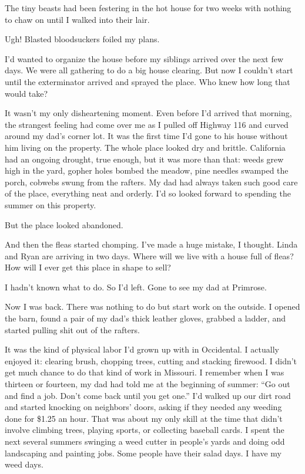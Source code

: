 \documentclass[12pt]{book}
\begin{document}
The tiny beasts had been festering in the hot house for two weeks with nothing to chaw on until I walked into their lair.

Ugh! Blasted bloodsuckers foiled my plans.

I'd wanted to organize the house before my siblings arrived over the next few days. We were all gathering to do a big house clearing. But now I couldn't start until the exterminator arrived and sprayed the place. Who knew how long that would take?

It wasn't my only disheartening moment. Even before I'd arrived that morning, the strangest feeling had come over me as I pulled off Highway 116 and curved around my dad's corner lot. It was the first time I'd gone to his house without him living on the property. The whole place looked dry and brittle. California had an ongoing drought, true enough, but it was more than that: weeds grew high in the yard, gopher holes bombed the meadow, pine needles swamped the porch, cobwebs swung from the rafters. My dad had always taken such good care of the place, everything neat and orderly. I'd so looked forward to spending the summer on this property.

But the place looked abandoned.

And then the fleas started chomping. I've made a huge mistake, I thought. Linda and Ryan are arriving in two days. Where will we live with a house full of fleas? How will I ever get this place in shape to sell?

I hadn't known what to do. So I'd left. Gone to see my dad at Primrose.

Now I was back. There was nothing to do but start work on the outside. I opened the barn, found a pair of my dad's thick leather gloves, grabbed a ladder, and started pulling shit out of the rafters.

It was the kind of physical labor I'd grown up with in Occidental. I actually enjoyed it: clearing brush, chopping trees, cutting and stacking firewood. I didn't get much chance to do that kind of work in Missouri. I remember when I was thirteen or fourteen, my dad had told me at the beginning of summer: ``Go out and find a job. Don't come back until you get one.'' I'd walked up our dirt road and started knocking on neighbors' doors, asking if they needed any weeding done for \$1.25 an hour. That was about my only skill at the time that didn't involve climbing trees, playing sports, or collecting baseball cards. I spent the next several summers swinging a weed cutter in people's yards and doing odd landscaping and painting jobs. Some people have their salad days. I have my weed days.
\end{document}
